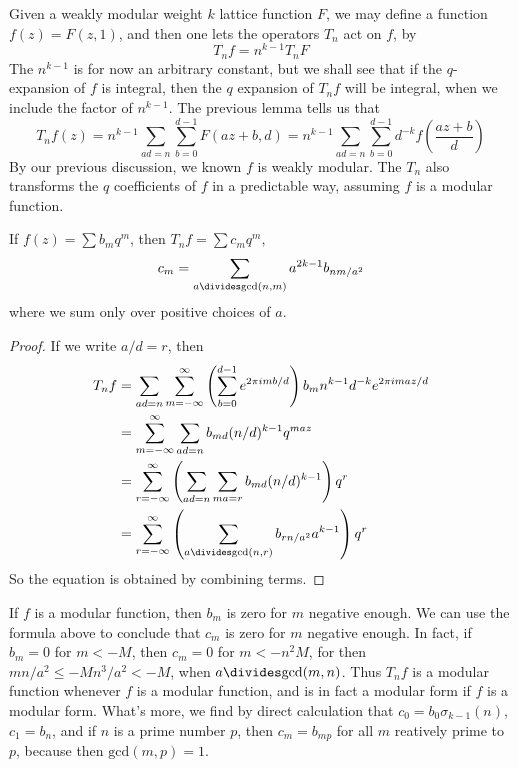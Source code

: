 Given a weakly modular weight $k$ lattice function $F$, we may define a function $f(z) = F(z,1)$, and then one lets the operators $T_n$ act on $f$, by
%
\[ T_n f = n^{k-1} T_n F \]
%
The $n^{k-1}$ is for now an arbitrary constant, but we shall see that if the $q$-expansion of $f$ is integral, then the $q$ expansion of $T_n f$ will be integral, when we include the factor of $n^{k-1}$. The previous lemma tells us that
%
\[ T_n f (z) = n^{k-1} \sum_{ad = n} \sum_{b = 0}^{d-1} F(az + b, d) = n^{k-1} \sum_{ad = n} \sum_{b = 0}^{d-1} d^{-k} f \left( \frac{az + b}{d} \right) \]
%
By our previous discussion, we known $f$ is weakly modular. The $T_n$ also transforms the $q$ coefficients of $f$ in a predictable way, assuming $f$ is a modular function.

\begin{theorem}
    If $f(z) = \sum b_m q^m$, then $T_nf = \sum c_m q^m$,
    \[ c_m = \sum_{a \divides \text{gcd}(n,m)} a^{2k-1} b_{nm/a^2} \]
    where we sum only over positive choices of $a$.
\end{theorem}
\begin{proof}
    If we write $a/d = r$, then
    \begin{align*}
        T_n f &= \sum_{ad = n} \sum_{m = -\infty}^\infty \left( \sum_{b = 0}^{d-1} e^{2 \pi i mb/d} \right) b_m n^{k-1} d^{-k} e^{2 \pi i maz/d}\\
        &= \sum_{m = -\infty}^\infty \sum_{ad = n} b_{md} (n/d)^{k-1} q^{maz}\\
        &= \sum_{r = -\infty}^\infty \left( \sum_{ad = n} \sum_{ma = r} b_{md} (n/d)^{k-1} \right) q^r\\
        &= \sum_{r = -\infty}^\infty \left( \sum_{a \divides \text{gcd}(n,r)} b_{rn/a^2} a^{k-1} \right) q^r
    \end{align*}
    So the equation is obtained by combining terms.
\end{proof}

If $f$ is a modular function, then $b_m$ is zero for $m$ negative enough. We can use the formula above to conclude that $c_m$ is zero for $m$ negative enough. In fact, if $b_m = 0$ for $m < -M$, then $c_m = 0$ for $m < -n^2M$, for then $mn/a^2 \leq -Mn^3/a^2 < -M$, when $a \divides \text{gcd}(m,n)$. Thus $T_n f$ is a modular function whenever $f$ is a modular function, and is in fact a modular form if $f$ is a modular form. What's more, we find by direct calculation that $c_0 = b_0 \sigma_{k-1}(n)$, $c_1 = b_n$, and if $n$ is a prime number $p$, then $c_m = b_{mp}$ for all $m$ reatively prime to $p$, because then $\text{gcd}(m,p) = 1$.

